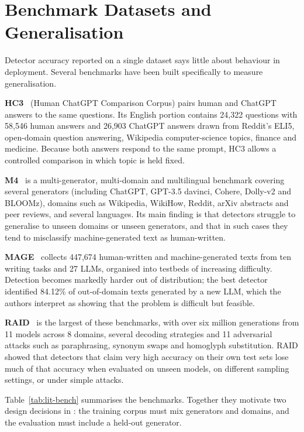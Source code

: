 \section{Benchmark Datasets and Generalisation}
\label{sec:lit-bench}

Detector accuracy reported on a single dataset says little about behaviour in
deployment. Several benchmarks have been built specifically to measure
generalisation.

\textbf{HC3}~\cite{guo2023hc3} (Human ChatGPT Comparison Corpus) pairs human
and ChatGPT answers to the same questions. Its English portion contains 24,322
questions with 58,546 human answers and 26,903 ChatGPT answers drawn from
Reddit's ELI5, open-domain question answering, Wikipedia computer-science
topics, finance and medicine. Because both answers respond to the same prompt,
HC3 allows a controlled comparison in which topic is held fixed.

\textbf{M4}~\cite{wang2024m4} is a multi-generator, multi-domain and
multilingual benchmark covering several generators (including ChatGPT,
GPT-3.5 davinci, Cohere, Dolly-v2 and BLOOMz), domains such as Wikipedia,
WikiHow, Reddit, arXiv abstracts and peer reviews, and several languages. Its
main finding is that detectors struggle to generalise to unseen domains or
unseen generators, and that in such cases they tend to misclassify
machine-generated text as human-written.

\textbf{MAGE}~\cite{li2024mage} collects 447,674 human-written and
machine-generated texts from ten writing tasks and 27 LLMs, organised into
testbeds of increasing difficulty. Detection becomes markedly harder
out of distribution; the best detector identified 84.12\% of out-of-domain
texts generated by a new LLM, which the authors interpret as showing that the
problem is difficult but feasible.

\textbf{RAID}~\cite{dugan2024raid} is the largest of these benchmarks, with
over six million generations from 11 models across 8 domains, several decoding
strategies and 11 adversarial attacks such as paraphrasing, synonym swaps and
homoglyph substitution. RAID showed that detectors that claim very high
accuracy on their own test sets lose much of that accuracy when evaluated on
unseen models, on different sampling settings, or under simple attacks.

Table~\ref{tab:lit-bench} summarises the benchmarks. Together they motivate two
design decisions in \veriscript{}: the training corpus must mix generators and
domains, and the evaluation must include a held-out generator.

